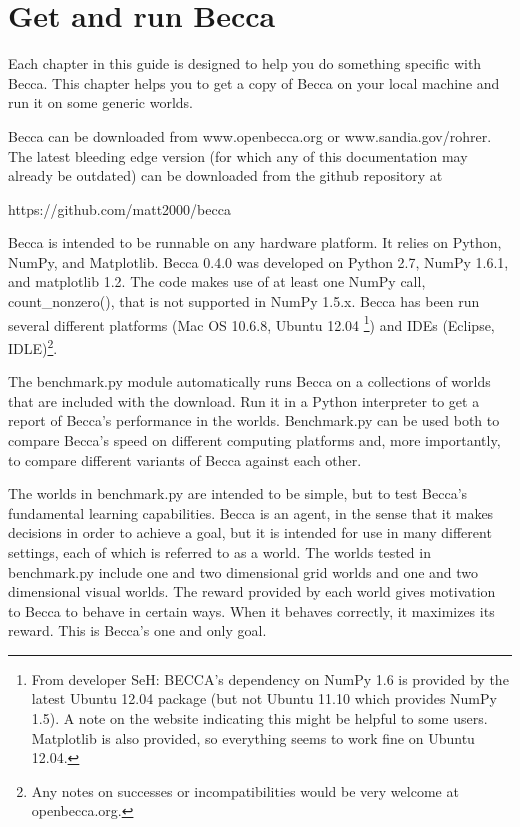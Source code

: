 \chapter{Get and run Becca}

Each chapter in this guide is designed to help you do something specific with Becca. This chapter helps you to get a copy of Becca on your local machine and run it on some generic worlds.

Becca can be downloaded from www.openbecca.org or www.sandia.gov/rohrer. The latest bleeding edge version (for which any of this documentation may already be outdated) can be downloaded from the github repository at

https://github.com/matt2000/becca 

Becca is intended to be runnable on any hardware platform. It relies on Python, NumPy, and Matplotlib. Becca 0.4.0 was developed on Python 2.7, NumPy 1.6.1, and matplotlib 1.2. The code makes use of at least one NumPy call, count\_nonzero(), that is not supported in NumPy 1.5.x. Becca has been run several different platforms (Mac OS 10.6.8, Ubuntu 12.04 \footnote{From developer SeH: BECCA's dependency on NumPy 1.6 is provided by the latest Ubuntu 12.04 package (but not Ubuntu 11.10 which provides NumPy 1.5).  A note on the website indicating this might be helpful to some users.  Matplotlib is also provided, so everything seems to work fine on Ubuntu 12.04.}) and IDEs (Eclipse, IDLE)\footnote{Any notes on successes or incompatibilities would be very welcome at openbecca.org.}. 

The benchmark.py module automatically runs Becca on a collections of worlds that are included with the download. Run it in a Python interpreter to get a report of Becca's performance in the worlds. Benchmark.py can be used both to compare Becca's speed on different computing platforms and, more importantly, to compare different variants of Becca against each other.

The worlds in benchmark.py are intended to be simple, but to test Becca's fundamental learning capabilities. Becca is an agent, in the sense that it makes decisions in order to achieve a goal, but it is intended for use in many different settings, each of which is referred to as a world. The worlds tested in benchmark.py include one and two dimensional grid worlds and one and two dimensional visual worlds. The reward provided by each world gives motivation to Becca to behave in certain ways. When it behaves correctly, it maximizes its reward. This is Becca's one and only goal.